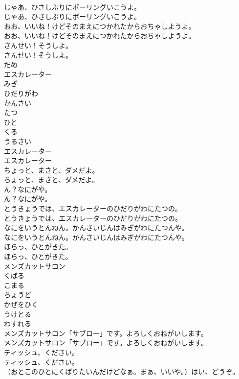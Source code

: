 \documentclass[8pt]{extreport}
\begin{document}
\begin{CJK}{UTF8}{min}
\\	じゃあ、ひさしぶりにボーリングいこうよ。	
\\	じゃあ、ひさしぶりにボーリングいこうよ。 
\\	おお、いいね！けどそのまえにつかれたからおちゃしようよ。	
\\	おお、いいね！けどそのまえにつかれたからおちゃしようよ。 
\\	さんせい！そうしよ。	
\\	さんせい！そうしよ。 
\\	だめ
\\	エスカレーター
\\	みぎ
\\	ひだりがわ
\\	かんさい
\\	たつ
\\	ひと
\\	くる
\\	うるさい
\\	エスカレーター	
\\	エスカレーター 
\\	ちょっと、まさと、ダメだよ。	
\\	ちょっと、まさと、ダメだよ。 
\\	ん？なにがや。	
\\	ん？なにがや。 
\\	とうきょうでは、エスカレーターのひだりがわにたつの。	
\\	とうきょうでは、エスカレーターのひだりがわにたつの。 
\\	なにをいうとんねん。かんさいじんはみぎがわにたつんや。	
\\	なにをいうとんねん。かんさいじんはみぎがわにたつんや。 
\\	ほらっ、ひとがきた。	
\\	ほらっ、ひとがきた。 
\\	メンズカットサロン
\\	くばる
\\	こまる
\\	ちょうど
\\	かぜをひく
\\	うけとる
\\	わすれる
\\	メンズカットサロン「サブロー」です。よろしくおねがいします。	
\\	メンズカットサロン「サブロー」です。よろしくおねがいします。 
\\	ティッシュ、ください。	
\\	ティッシュ、ください。 
\\	（おとこのひとにくばりたいんだけどなぁ。まぁ、いいや。）はい、どうぞ。	

\end{CJK}
\end{document}
